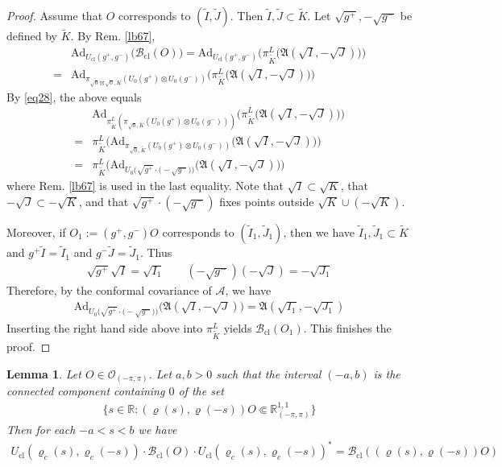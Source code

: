 \documentclass[11pt,b5paper,notitlepage]{article}
\theoremstyle{definition}
\theoremstyle{plain}
\newtheorem{lm}[df]{Lemma}
\newcommand{\fk}{\mathfrak}
\newcommand{\wtd}{\widetilde}
\newcommand{\ovl}{\overline}
\newcommand{\Ad}{\mathrm{Ad}}
\newcommand{\Rbb}{\mathbb R}
\newcommand{\MA}{\mathcal A}
\newcommand{\sqz}{{\sqrt 0}}
\newcommand{\Rpp}{\mathbb R^{1,1}_{(-\pi,\pi)}}
\newcommand{\Bcl}{\mathcal B_{\mathrm{cl}}}
\newcommand{\Opp}{\mathcal O_{(-\pi,\pi)}}
\newcommand{\Ucl}{U_{\mathrm{cl}}}
\numberwithin{equation}{section}
\begin{document}
\begin{proof}
Assume that $O$ corresponds to $(\wtd I,\wtd J)$. Then $\wtd I,\wtd J\subset\wtd K$. Let $\sqrt{g^+},-\sqrt{g^-}$ be defined by $\wtd K$. By Rem. \ref{lb67},
\begin{align}
&\Ad_{\Ucl(g^+,g^-)}\big(\Bcl(O)\big)=\Ad_{\Ucl(g^+,g^-)}\Big(\pi^L_{\wtd K}\big(\fk A(\sqrt I,-\sqrt J)\big)\Big)\nonumber\\
=&\Ad_{\pi_{\sqz\boxtimes\ovl\sqz,K}(U_0(g^+)\otimes U_0(g^-))}\Big(\pi^L_{\wtd K}\big(\fk A(\sqrt I,-\sqrt J)\big)\Big)\nonumber
\end{align}
By \eqref{eq28}, the above equals
\begin{align*}
&\Ad_{\pi^L_{\wtd K}(\pi_{\sqz,\wtd K}(U_0(g^+)\otimes U_0(g^-)))}\Big(\pi^L_{\wtd K}\big(\fk A(\sqrt I,-\sqrt J)\big)\Big)\\
=&\pi^L_{\wtd K}\Big(\Ad_{\pi_{\sqz,\wtd K}(U_0(g^+)\otimes U_0(g^-))}\big(\fk A(\sqrt I,-\sqrt J)\big)\Big)\\
=&\pi^L_{\wtd K}\Big(\Ad_{U_0\big(\sqrt{g^+}\cdot\big(-\sqrt{g^-}\big)\big)}\big(\fk A(\sqrt I,-\sqrt J)\big)\Big)
\end{align*}
where Rem. \ref{lb67} is used in the last equality. Note that $\sqrt I\subset\sqrt K$, that $-\sqrt J\subset-\sqrt K$, and that $\sqrt{g^+}\cdot(-\sqrt{g^-})$ fixes points outside $\sqrt K\cup(-\sqrt K)$. 

Moreover, if $O_1:=(g^+,g^-)O$ corresponds to $(\wtd I_1,\wtd J_1)$, then we have $\wtd I_1,\wtd J_1\subset\wtd K$ and $g^+\wtd I=\wtd I_1$ and $g^-\wtd J=\wtd J_1$. Thus
\begin{align*}
\sqrt{g^+}\sqrt I=\sqrt{I_1}\qquad (-\sqrt{g^-})(-\sqrt J)=-\sqrt{J_1}
\end{align*}
Therefore, by the conformal covariance of $\MA$, we have
\begin{align*}
\Ad_{U_0\big(\sqrt{g^+}\cdot\big(-\sqrt{g^-}\big)\big)}\big(\fk A(\sqrt I,-\sqrt J)\big)=\fk A(\sqrt{I_1},-\sqrt{J_1})
\end{align*}
Inserting the right hand side above into $\pi^L_{\wtd K}$ yields $\Bcl(O_1)$. This finishes the proof.
\end{proof}

\begin{lm}\label{lb69}
Let $O\in\Opp$. Let $a,b>0$ such that the interval $(-a,b)$ is the connected component containing $0$ of the set
\begin{align*}
\big\{s\in\Rbb:(\varrho(s),\varrho(-s))O\Subset\Rpp\big\}
\end{align*}
Then for each $-a<s<b$ we have
\begin{align*}
\Ucl(\varrho_c(s),\varrho_c(-s))\cdot\Bcl(O)\cdot\Ucl(\varrho_c(s),\varrho_c(-s))^*=\Bcl((\varrho(s),\varrho(-s))O)
\end{align*}
\end{lm}
\end{document}
